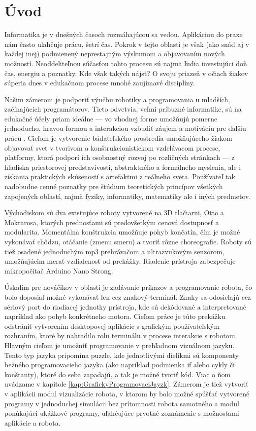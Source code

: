 
\chapter*{Úvod} %

Informatika je v dnešných časoch rozmáhajúcou sa vedou. Aplikáciou do praxe nám často uľahčuje prácu, šetrí čas. Pokrok v tejto oblasti je však (ako snáď aj v každej inej) podmienený neprestajným výskumom a objavovaním nových možností. Neoddeliteľnou súčasťou tohto procesu sú najmä ľudia investujúci doň čas, energiu a poznatky. Kde však takých nájsť? O svoju priazeň v očiach žiakov súperia dnes v edukačnom procese mnohé zaujímavé disciplíny.

Našim zámerom je podporiť výučbu robotiky a programovania u mladších, začínajúcich programátorov. Tieto odvetvia, veľmi príbuzné informatike, sú na edukačné účely priam ideálne --- vo vhodnej forme umožňujú pomerne jednoducho, hravou formou a interakciou vzbudiť záujem a motiváciu pre ďalšiu prácu \cite{parker2019learning}. Cieľom je vytvorenie bádateľského prostredia umožňujúceho žiakom objavovať svet v tvorivom a konštrukcionistickom vzdelávacom procese, platformy, ktorá podporí ich osobnostný rozvoj po rozličných stránkach --- z hľadiska priestorovej predstavivosti, abstraktného a formálneho myslenia, ale i získania praktických skúseností s artefaktmi z reálneho sveta. Používateľ tak nadobudne cenné poznatky pre štúdium teoretických princípov všetkých zapojených oblastí, najmä fyziky, informatiky, matematiky ale i iných predmetov.

Východiskom sú dva existujúce roboty vytvorené na 3D tlačiarni, Otto a Mokrarosa, ktorých prednosťami sú predovšetkým cenová dostupnosť a modularita. Momentálna konštrukcia umožňuje pohyb končatín, čím je možné vykonávať chôdzu, otáčanie (zmenu smeru) a tvoriť rôzne choreografie. Roboty sú tiež osadené jednoduchým mp3 prehrávačom a ultrazvukovým senzorom, umožňujúcim merať vzdialenosť od prekážky. Riadenie prístroja zabezpečuje mikropočítač Arduino Nano Strong.

Úskalím pre nováčikov v oblasti je zadávanie príkazov a programovanie robota, čo bolo doposiaľ možné vykonávať len cez znakový terminál. Znaky sa odosielajú cez sériový port do riadiacej jednotky prístroja, kde sú dekódované a interpretované napríklad ako pohyb konkrétneho motora. Cieľom práce je túto prekážku odstrániť vytvorením desktopovej aplikácie s grafickým používateľským rozhraním, ktoré by nahradilo rolu terminálu v procese interakcie s robotom. Hlavným cieľom je umožniť programovanie v prehľadnom vizuálnom jazyku. Tento typ jazyka pripomína puzzle, kde jednotlivými dielikmi sú komponenty bežného programovacieho jazyka (ako napríklad podmienka if alebo cykly či konštanty), ktoré do seba zapadajú, a tak je možné tvoriť kód. Viac o ňom uvádzame v kapitole \ref{kap:GrafickyProgramovaciJayzk}. Zámerom je tiež vytvoriť v aplikácii modul vizualizácie robota, v ktorom by bolo možné spúšťať vytvorené programy v jednoduchej simulácii bez prítomnosti robota samotného a modul ponúkajúci ukážkové programy, uľahčujúce prvotné zoznámenie s možnosťami aplikácie a robota.

